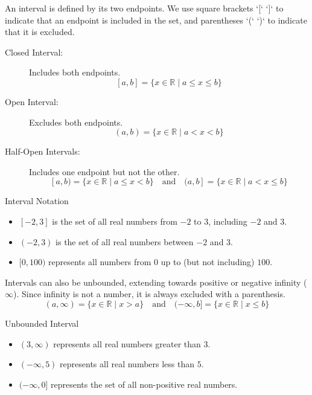 An interval is defined by its two endpoints. We use square brackets `[` `]` to indicate that an endpoint is included in the set, and parentheses `(` `)` to indicate that it is excluded.

\begin{description}
    \item[Closed Interval:] Includes both endpoints.
    \[ [a, b] = \{ x \in \mathbb{R} \mid a \leq x \leq b \} \]

    \item[Open Interval:] Excludes both endpoints.
    \[ (a, b) = \{ x \in \mathbb{R} \mid a < x < b \} \]

    \item[Half-Open Intervals:] Includes one endpoint but not the other.
    \[ [a, b) = \{ x \in \mathbb{R} \mid a \leq x < b \} \quad \text{and} \quad (a, b] = \{ x \in \mathbb{R} \mid a < x \leq b \} \]
\end{description}

\begin{example} Interval Notation
\begin{itemize}
    \item $[-2, 3]$ is the set of all real numbers from $-2$ to $3$, including $-2$ and $3$.
    \item $(-2, 3)$ is the set of all real numbers between $-2$ and $3$.
    \item $[0, 100)$ represents all numbers from $0$ up to (but not including) $100$.
\end{itemize}
\end{example}

Intervals can also be unbounded, extending towards positive or negative infinity ($\infty$). Since infinity is not a number, it is always excluded with a parenthesis.
\[ (a, \infty) = \{ x \in \mathbb{R} \mid x > a \} \quad \text{and} \quad (-\infty, b] = \{ x \in \mathbb{R} \mid x \leq b \} \]

\begin{example} Unbounded Interval
\begin{itemize}
    \item $(3, \infty)$ represents all real numbers greater than $3$.
    \item $(-\infty, 5)$ represents all real numbers less than $5$.
    \item $(-\infty, 0]$ represents the set of all non-positive real numbers.
\end{itemize}
\end{example}

